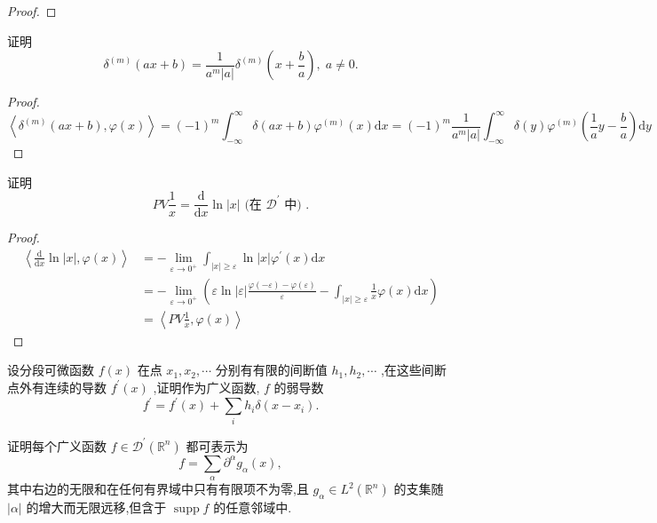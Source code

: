 \documentclass[lang=cn,newtx,10pt,scheme=chinese,thmcnt=chapter]{elegantbook}
\newcommand{\dif}{\mathrm{d}}
\begin{document}
\begin{problemset}
\begin{proof}
\end{proof}
  \item 证明
  \begin{equation*}
  {\delta }^{\left( m\right) }\left( {{ax} + b}\right)  = \frac{1}{{a}^{m}\left| a\right| }{\delta }^{\left( m\right) }\left( {x + \frac{b}{a}}\right),\;a \neq  0.
  \end{equation*}
\begin{proof}
    \[
    \left\langle   {\delta }^{\left( m\right) }\left( {{ax} + b}\right) ,\varphi(x)\right\rangle=(-1)^m\int_{-\infty}^\infty {\delta }\left( {{ax} + b}\right) \varphi^{(m)}(x)\dif x=(-1)^m\frac{1}{{a}^{m}|a|}\int_{-\infty}^\infty {\delta }\left(y\right) \varphi^{(m)}(\frac{1}{a}y-\frac{b}{a})\dif y
    \]
\end{proof}
  \item 证明
  \begin{equation*}
  {PV}\frac{1}{x} = \frac{\dif}{\dif {x}} {\ln \left| x\right|   }  \text{ (在 }{\mathcal{D}}^{\prime }\text{ 中) .}
  \end{equation*}
\begin{proof}
    \begin{equation*}
        \begin{aligned}
             \left\langle\frac{\dif}{\dif {x}} {\ln \left| x\right|   } ,\varphi(x)\right\rangle&=-\lim\limits_{\varepsilon\to 0^+}\int_{|x|\geqslant\varepsilon}\ln|x|\varphi^\prime(x)\dif x\\&=-\lim\limits_{\varepsilon\to 0^+}\left(\varepsilon\ln|\varepsilon|\frac{\varphi(-\varepsilon)-\varphi(\varepsilon)}{\varepsilon}-\int_{|x|\geqslant\varepsilon}\frac{1}{x}\varphi(x)\dif x\right)\\&=\left\langle PV\frac{1}{x},\varphi(x)\right\rangle
        \end{aligned}
    \end{equation*}
\end{proof}
  \item 设分段可微函数 \(f\left( x\right)\) 在点 \({x}_{1},{x}_{2},\cdots\) 分别有有限的间断值 \({h}_{1},{h}_{2},\cdots\) ,在这些间断点外有连续的导数 \({f}^{\prime }\left( x\right)\) ,证明作为广义函数, \(f\) 的弱导数
  \begin{equation*}
  {f}^{\prime } = {f}^{\prime }\left( x\right)  + \mathop{\sum }\limits_{i}{h}_{i}\delta \left( {x - {x}_{i}}\right).
  \end{equation*}

  \item 证明每个广义函数 \(f \in  {\mathcal{D}}^{\prime }\left( {\mathbb{R}}^{n}\right)\) 都可表示为
  \begin{equation*}
  f = \mathop{\sum }\limits_{\alpha }{\partial }^{\alpha }{g}_{\alpha }\left( x\right),
  \end{equation*}
  其中右边的无限和在任何有界域中只有有限项不为零,且 \({g}_{\alpha } \in  {L}^{2}\left( {\mathbb{R}}^{n}\right)\) 的支集随 \(\left| \alpha \right|\) 的增大而无限远移,但含于 \(\operatorname{supp}f\) 的任意邻域中.


\end{problemset}
\end{document}
